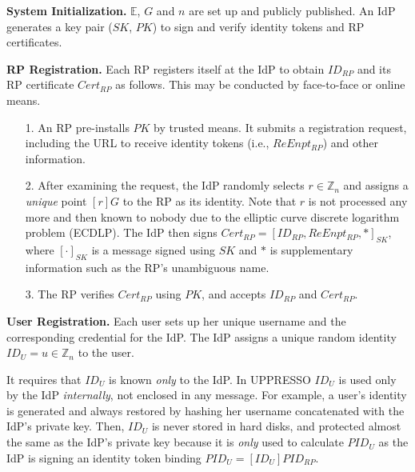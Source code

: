 \noindent \textbf{System Initialization.}
$\mathbb{E}$, $G$ and $n$ are set up and publicly published.
An IdP generates a key pair ($SK$, $PK$) to sign and verify identity tokens and RP certificates.


\noindent\textbf{RP Registration.}
Each RP registers itself at the IdP to obtain $ID_{RP}$ and its RP certificate $Cert_{RP}$ as follows.
This may be conducted by face-to-face or online \cite{OpenID-dy-regi} means.
\begin{enumerate}
\setlength{\topsep}{0pt}
\setlength{\partopsep}{0pt}
\setlength{\itemsep}{0pt}
\setlength{\parsep}{0pt}
\setlength{\parskip}{0pt}
\item[1.]
An RP pre-installs $PK$ by trusted means.
It submits a registration request, including the URL to receive identity tokens (i.e., $ReEnpt_{RP}$) and other information.
\item[2.]
After examining the request,
the IdP randomly selects $r \in \mathbb{Z}_n$
        and assigns a \emph{unique} point $[r]G$ to the RP as its identity.
Note that $r$ is not processed any more and then known to nobody
 due to the elliptic curve discrete logarithm problem (ECDLP).
The IdP then signs $Cert_{RP} = [ID_{RP}, ReEnpt_{RP}, *]_{SK}$,
     where $[\cdot]_{SK}$ is a message signed using $SK$ and $*$ is supplementary information such as the RP's unambiguous name.
\item[3.]
The RP verifies $Cert_{RP}$ using $PK$, and accepts $ID_{RP}$ and $Cert_{RP}$.
\end{enumerate}


\noindent\textbf{User Registration.}
Each user sets up her unique username and the corresponding credential for the IdP.
The IdP assigns
a unique random identity $ID_U = u\in \mathbb{Z}_n$ to the user.

It requires that $ID_U$ is known \emph{only} to the IdP.
In UPPRESSO $ID_U$ is used only by the IdP \emph{internally},
 not enclosed in any message.
For example, a user's identity is generated and always restored by hashing her username concatenated with the IdP's private key.
Then,
 $ID_U$ is never stored in hard disks,
 and protected almost the same as the IdP's private key
because it is \emph{only} used to calculate $PID_{U}$ as the IdP is signing an identity token binding $PID_{U}=
  [{ID_U}]{PID_{RP}}$.


